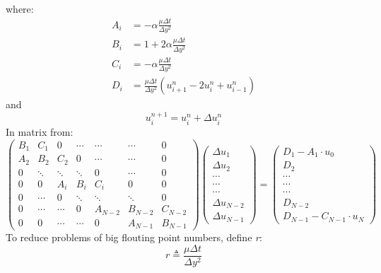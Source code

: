 \documentclass[11pt, a4paper]{article}
\begin{document}
where:
\begin{align}
    A_i &= - \alpha\frac{\mu\Delta t}{\Delta y^2}\\
    B_i &= 1 + 2 \alpha\frac{\mu\Delta t}{\Delta y^2}\\
    C_i &= - \alpha\frac{\mu\Delta t}{\Delta y^2}\\
    D_i &= \frac{\mu\Delta t}{\Delta y^2}\left(u^n_{i+1} - 2u^n_{i} + u^n_{i-1}\right)
\end{align}
and
\begin{equation}
    u^{n+1}_i = u^n_i + \Delta u^n_i
\end{equation}
In matrix from:
\begin{equation}
    \begin{pmatrix}
        B_1 & C_1 & 0 & \cdots & \cdots & \cdots & 0 \\
        A_2 & B_2 & C_2 & 0 & \cdots & \cdots & 0 \\
        0 & \ddots & \ddots & \ddots & 0 & \cdots & 0 \\
        0 & 0 & A_i & B_i & C_i & 0 & 0 \\
        0 & \cdots & 0 & \ddots & \ddots & \ddots & 0 \\
        0 & \cdots & \cdots & 0 & A_{N-2} & B_{N-2} & C_{N-2} \\
        0 & 0 & \cdots & \cdots & 0 & A_{N-1} &B_{N-1}
    \end{pmatrix}
    \begin{pmatrix}
        \Delta u_1\\
        \Delta u_2\\
        \cdots\\
        \cdots\\
        \cdots\\
        \Delta u_{N-2}\\
        \Delta u_{N-1}
    \end{pmatrix}
    =
    \begin{pmatrix}
        D_1-A_1\cdot u_0\\
        D_2\\
        \cdots\\
        \cdots\\
        \cdots\\
        D_{N-2}\\
        D_{N-1}-C_{N-1}\cdot u_N
    \end{pmatrix}
\end{equation}
To reduce problems of big flouting point numbers, define \emph{r}:
\begin{equation}
    r \triangleq \frac{\mu\Delta t}{\Delta y^2}
\end{equation}
\end{document}
